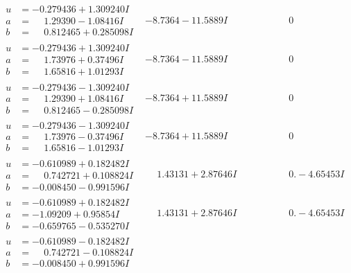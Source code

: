 \documentclass[1p]{elsarticle_modified}
\theoremstyle{definition}
\begin{document}
$$\begin{array}{c|c|c}
\begin{aligned}
u &= -0.279436 + 1.309240 I \\
a &= \phantom{-}1.29390 - 1.08416 I \\
b &= \phantom{-}0.812465 + 0.285098 I\end{aligned}
 & -8.7364 - 11.5889 I & \phantom{-0.000000 } 0 \\ \hline\begin{aligned}
u &= -0.279436 + 1.309240 I \\
a &= \phantom{-}1.73976 + 0.37496 I \\
b &= \phantom{-}1.65816 + 1.01293 I\end{aligned}
 & -8.7364 - 11.5889 I & \phantom{-0.000000 } 0 \\ \hline\begin{aligned}
u &= -0.279436 - 1.309240 I \\
a &= \phantom{-}1.29390 + 1.08416 I \\
b &= \phantom{-}0.812465 - 0.285098 I\end{aligned}
 & -8.7364 + 11.5889 I & \phantom{-0.000000 } 0 \\ \hline\begin{aligned}
u &= -0.279436 - 1.309240 I \\
a &= \phantom{-}1.73976 - 0.37496 I \\
b &= \phantom{-}1.65816 - 1.01293 I\end{aligned}
 & -8.7364 + 11.5889 I & \phantom{-0.000000 } 0 \\ \hline\begin{aligned}
u &= -0.610989 + 0.182482 I \\
a &= \phantom{-}0.742721 + 0.108824 I \\
b &= -0.008450 - 0.991596 I\end{aligned}
 & \phantom{-}1.43131 + 2.87646 I & \phantom{-0.000000 } 0. - 4.65453 I \\ \hline\begin{aligned}
u &= -0.610989 + 0.182482 I \\
a &= -1.09209 + 0.95854 I \\
b &= -0.659765 - 0.535270 I\end{aligned}
 & \phantom{-}1.43131 + 2.87646 I & \phantom{-0.000000 } 0. - 4.65453 I \\ \hline\begin{aligned}
u &= -0.610989 - 0.182482 I \\
a &= \phantom{-}0.742721 - 0.108824 I \\
b &= -0.008450 + 0.991596 I\end{aligned}

\end{array}$$
\end{document}
